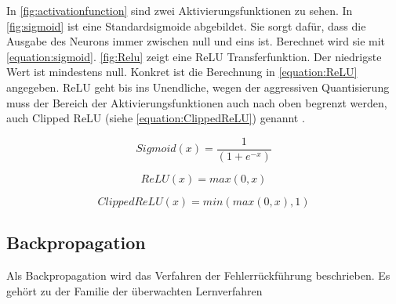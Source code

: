In \autoref{fig:activationfunction} sind zwei Aktivierungsfunktionen zu sehen. In \autoref{fig:sigmoid} ist eine Standardsigmoide abgebildet. Sie sorgt dafür, dass die Ausgabe des Neurons immer zwischen null und eins ist. Berechnet wird sie mit \autoref{equation:sigmoid}. \autoref{fig:Relu} zeigt eine \ac{ReLU} Transferfunktion. Der niedrigste Wert ist mindestens null. Konkret ist die Berechnung in \autoref{equation:ReLU} angegeben. \ac{ReLU} geht bis ins Unendliche, wegen der aggressiven Quantisierung muss der Bereich der Aktivierungsfunktionen auch nach oben begrenzt werden, auch Clipped \ac{ReLU} (siehe \autoref{equation:ClippedReLU}) genannt \cite{StockfishNNUE}.

\begin{equation}
  Sigmoid(x)=\frac{1}{(1+e^{-x})}
  \label{equation:sigmoid}
\end{equation}

\begin{equation}
  ReLU(x)=max(0,x)
  \label{equation:ReLU}
\end{equation}


\begin{equation}
  ClippedReLU(x)=min(max(0,x),1)
  \label{equation:ClippedReLU}
\end{equation}

\subsection{Backpropagation}
Als Backpropagation wird das Verfahren der Fehlerrückführung beschrieben. Es gehört zu der Familie der überwachten Lernverfahren





